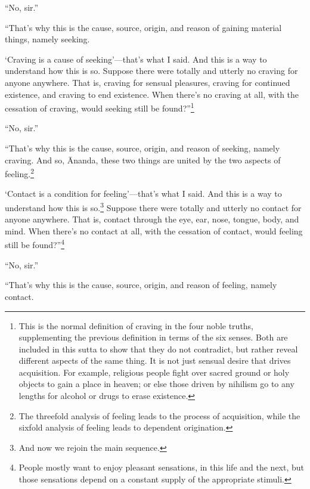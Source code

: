\documentclass[12pt,openany]{book}%
\begin{document}
“No, sir.” 

“That’s why this is the cause, source, origin, and reason of gaining material things, namely seeking. 

‘Craving is a cause of seeking’—that’s what I said. And this is a way to understand how this is so. Suppose there were totally and utterly no craving for anyone anywhere. That is, craving for sensual pleasures, craving for continued existence, and craving to end existence. When there’s no craving at all, with the cessation of craving, would seeking still be found?”\footnote{This is the normal definition of craving in the four noble truths, supplementing the previous definition in terms of the six senses. Both are included in this sutta to show that they do not contradict, but rather reveal different aspects of the same thing. It is not just sensual desire that drives acquisition. For example, religious people fight over sacred ground or holy objects to gain a place in heaven; or else those driven by nihilism go to any lengths for alcohol or drugs to erase existence. } 

“No, sir.” 

“That’s why this is the cause, source, origin, and reason of seeking, namely craving. And so, Ānanda, these two things are united by the two aspects of feeling.\footnote{The threefold analysis of feeling leads to the process of acquisition, while the sixfold analysis of feeling leads to dependent origination. } 

‘Contact is a condition for feeling’—that’s what I said. And this is a way to understand how this is so.\footnote{And now we rejoin the main sequence. } Suppose there were totally and utterly no contact for anyone anywhere. That is, contact through the eye, ear, nose, tongue, body, and mind. When there’s no contact at all, with the cessation of contact, would feeling still be found?”\footnote{People mostly want to enjoy pleasant sensations, in this life and the next, but those sensations depend on a constant supply of the appropriate stimuli. } 

“No, sir.” 

“That’s why this is the cause, source, origin, and reason of feeling, namely contact. 
\end{document}
